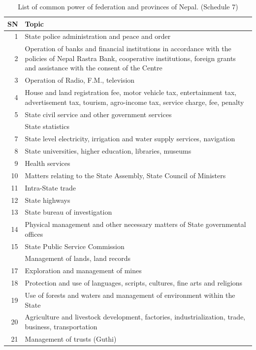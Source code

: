 \documentclass[
  openany]{book}
\begin{document}
\begingroup\fontsize{10}{12}\selectfont

\begin{longtable}[t]{r>{\raggedright\arraybackslash}p{35em}}
\caption{\label{tab:power-division-fed-prov}List of common power of federation and provinces of Nepal. (Schedule 7)}\\
\toprule
SN & Topic\\
\midrule
\rowcolor{gray!6}  1 & State police administration and peace and order\\
2 & Operation of banks and financial institutions in accordance with the policies of Nepal Rastra Bank, cooperative institutions, foreign grants and assistance with the consent of the Centre\\
\rowcolor{gray!6}  3 & Operation of Radio, F.M., television\\
4 & House and land registration fee, motor vehicle tax, entertainment tax, advertisement tax, tourism, agro-income tax, service charge, fee, penalty\\
\rowcolor{gray!6}  5 & State civil service and other government services\\
\addlinespace
6 & State statistics\\
\rowcolor{gray!6}  7 & State level electricity, irrigation and water supply services, navigation\\
8 & State universities, higher education, libraries, museums\\
\rowcolor{gray!6}  9 & Health services\\
10 & Matters relating to the State Assembly, State Council of Ministers\\
\addlinespace
\rowcolor{gray!6}  11 & Intra-State trade\\
12 & State highways\\
\rowcolor{gray!6}  13 & State bureau of investigation\\
14 & Physical management and other necessary matters of State governmental offices\\
\rowcolor{gray!6}  15 & State Public Service Commission\\
\addlinespace
16 & Management of lands, land records\\
\rowcolor{gray!6}  17 & Exploration and management of mines\\
18 & Protection and use of languages, scripts, cultures, fine arts and religions\\
\rowcolor{gray!6}  19 & Use of forests and waters and management of environment within the State\\
20 & Agriculture and livestock development, factories, industrialization, trade, business, transportation\\
\addlinespace
\rowcolor{gray!6}  21 & Management of trusts (Guthi)\\
\bottomrule
\end{longtable}
\endgroup{}
\end{document}
